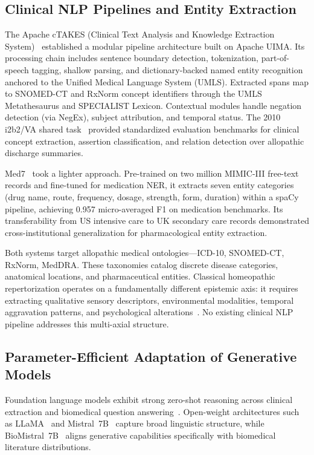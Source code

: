 \subsection{Clinical NLP Pipelines and Entity Extraction}

The Apache cTAKES (Clinical Text Analysis and Knowledge Extraction System)~\cite{savova2010mayo} established a modular pipeline architecture built on Apache UIMA. Its processing chain includes sentence boundary detection, tokenization, part-of-speech tagging, shallow parsing, and dictionary-backed named entity recognition anchored to the Unified Medical Language System (UMLS). Extracted spans map to SNOMED-CT and RxNorm concept identifiers through the UMLS Metathesaurus and SPECIALIST Lexicon. Contextual modules handle negation detection (via NegEx), subject attribution, and temporal status. The 2010 i2b2/VA shared task~\cite{uzuner2011challenges} provided standardized evaluation benchmarks for clinical concept extraction, assertion classification, and relation detection over allopathic discharge summaries.

Med7~\cite{kormilitzin2021med7} took a lighter approach. Pre-trained on two million MIMIC-III free-text records and fine-tuned for medication NER, it extracts seven entity categories (drug name, route, frequency, dosage, strength, form, duration) within a spaCy pipeline, achieving 0.957 micro-averaged F1 on medication benchmarks. Its transferability from US intensive care to UK secondary care records demonstrated cross-institutional generalization for pharmacological entity extraction.

Both systems target allopathic medical ontologies---ICD-10, SNOMED-CT, RxNorm, MedDRA. These taxonomies catalog discrete disease categories, anatomical locations, and pharmaceutical entities. Classical homeopathic repertorization operates on a fundamentally different epistemic axis: it requires extracting qualitative sensory descriptors, environmental modalities, temporal aggravation patterns, and psychological alterations~\cite{kent1897}. No existing clinical NLP pipeline addresses this multi-axial structure.

\subsection{Parameter-Efficient Adaptation of Generative Models}

Foundation language models exhibit strong zero-shot reasoning across clinical extraction and biomedical question answering~\cite{rajpurkar2016squad,he2023annollm}. Open-weight architectures such as LLaMA~\cite{touvron2023llama} and Mistral~7B~\cite{jiang2023mistral} capture broad linguistic structure, while BioMistral~7B~\cite{labrak2024biomistral} aligns generative capabilities specifically with biomedical literature distributions.

